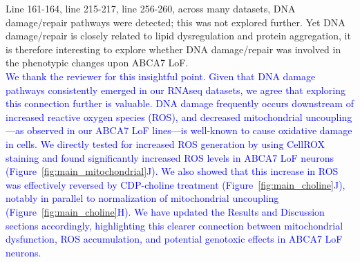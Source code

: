 Line 161-164, line 215-217, line 256-260, across many datasets, DNA damage/repair pathways were detected; this was not explored further. Yet DNA damage/repair is closely related to lipid dysregulation and protein aggregation, it is therefore interesting to explore whether DNA damage/repair was involved in the phenotypic changes upon ABCA7 LoF.\\
\textcolor{blue}{We thank the reviewer for this insightful point. Given that DNA damage pathways consistently emerged in our RNAseq datasets, we agree that exploring this connection further is valuable. DNA damage frequently occurs downstream of increased reactive oxygen species (ROS)\cite{Welch2022-bp}, and decreased mitochondrial uncoupling—as observed in our ABCA7 LoF lines—is well-known to cause oxidative damage in cells\cite{Jain2024-br, Crivelli2024-pf}. We directly tested for increased ROS generation by using CellROX staining and found significantly increased ROS levels in ABCA7 LoF neurons (Figure~\ref{fig:main_mitochondrial}J). We also showed that this increase in ROS was effectively reversed by CDP-choline treatment (Figure~\ref{fig:main_choline}J), notably in parallel to normalization of mitochondrial uncoupling (Figure~\ref{fig:main_choline}H). We have updated the Results and Discussion sections accordingly, highlighting this clearer connection between mitochondrial dysfunction, ROS accumulation, and potential genotoxic effects in ABCA7 LoF neurons.}

